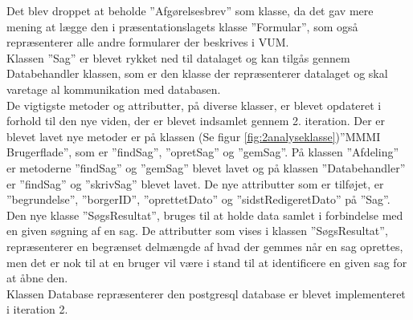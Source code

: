 Det blev droppet at beholde ”Afgørelsesbrev” som klasse, da det gav mere mening at lægge den i præsentationslagets klasse ”Formular”, som også repræsenterer alle andre formularer der beskrives i VUM.\\
Klassen ”Sag” er blevet rykket ned til datalaget og kan tilgås gennem Databehandler klassen, som er den klasse der repræsenterer datalaget og skal varetage al kommunikation med databasen.\\
De vigtigste metoder og attributter, på diverse klasser, er blevet opdateret i forhold til den nye viden, der er blevet indsamlet gennem 2. iteration. Der er blevet lavet nye metoder er på klassen (Se figur \ref{fig:2analyseklasse})”MMMI Brugerflade”, som er ”findSag”, ”opretSag” og ”gemSag”. På klassen ”Afdeling” er metoderne ”findSag” og ”gemSag” blevet lavet og på klassen ”Databehandler” er ”findSag” og ”skrivSag” blevet lavet. De nye attributter som er tilføjet, er ”begrundelse”, ”borgerID”, ”oprettetDato” og ”sidstRedigeretDato” på ”Sag”. \\
Den nye klasse ”SøgsResultat”, bruges til at holde data samlet i forbindelse med en given søgning af en sag. De attributter som vises i klassen ”SøgsResultat”, repræsenterer en begrænset delmængde af hvad der gemmes når en sag oprettes, men det er nok til at en bruger vil være i stand til at identificere en given sag for at åbne den.\\
Klassen Database repræsenterer den postgresql database er blevet implementeret i iteration 2.

